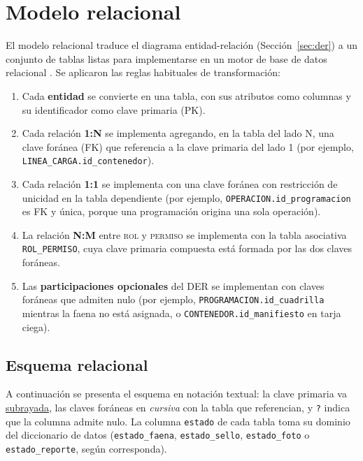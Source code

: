 \chapter{Modelo relacional}
\label{cap:relacional}

El modelo relacional traduce el diagrama entidad-relación (Sección~\ref{sec:der}) a un conjunto
de tablas listas para implementarse en un motor de base de datos relacional
\parencite{codd1970, elmasri2016}. Se aplicaron las reglas habituales de transformación:

\begin{enumerate}
    \item Cada \textbf{entidad} se convierte en una tabla, con sus atributos como columnas y su
    identificador como clave primaria (PK).
    \item Cada relación \textbf{1:N} se implementa agregando, en la tabla del lado N, una clave
    foránea (FK) que referencia a la clave primaria del lado 1 (por ejemplo,
    \texttt{LINEA\_CARGA.id\_contenedor}).
    \item Cada relación \textbf{1:1} se implementa con una clave foránea con restricción de
    unicidad en la tabla dependiente (por ejemplo, \texttt{OPERACION.id\_programacion} es FK y
    única, porque una programación origina una sola operación).
    \item La relación \textbf{N:M} entre \textsc{rol} y \textsc{permiso} se implementa con la
    tabla asociativa \texttt{ROL\_PERMISO}, cuya clave primaria compuesta está formada por las
    dos claves foráneas.
    \item Las \textbf{participaciones opcionales} del DER se implementan con claves foráneas que
    admiten nulo (por ejemplo, \texttt{PROGRAMACION.id\_cuadrilla} mientras la faena no está
    asignada, o \texttt{CONTENEDOR.id\_manifiesto} en tarja ciega).
\end{enumerate}

\section{Esquema relacional}

A continuación se presenta el esquema en notación textual: la clave primaria va
\uline{subrayada}, las claves foráneas en \textit{cursiva} con la tabla que referencian, y
\texttt{?} indica que la columna admite nulo. La columna \texttt{estado} de cada tabla toma su
dominio del diccionario de datos (\texttt{estado\_faena}, \texttt{estado\_sello},
\texttt{estado\_foto} o \texttt{estado\_reporte}, según corresponda).

